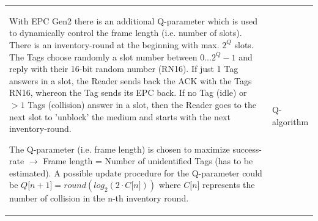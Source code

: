 	\begin{tabular}{ll}
		\parbox{10cm}{
			With EPC Gen2 there is an additional Q-parameter which is used to dynamically control the frame length (i.e. number of slots). 
			There is an inventory-round at the beginning with max. $2^Q$ slots. The Tags choose randomly a slot number between $0 ... 2^Q-1$ and 
			reply with their 16-bit random number (RN16). If just 1 Tag answers in a slot, the Reader sends back the ACK with the Tags RN16, 
			whereon the Tag sends its EPC back. If no Tag (idle) or $>1$ Tags (collision) answer in a slot, then the Reader goes to the next 
			slot to 'unblock' the medium and starts with the next inventory-round.
			
			The Q-parameter (i.e. frame length) is chosen to maximize success-rate $\rightarrow$ Frame length = Number of unidentified Tags (has to be estimated).
			A possible update procedure for the Q-parameter could be \\
			$Q\lbrack n+1\rbrack = round(log_2(2\cdot C\lbrack n\rbrack))$ where $C\lbrack n\rbrack$ represents the number of collision in the n-th 
			inventory round.
		}	
		& \parbox{8cm}{
			\\ Q-algorithm
		}
	\end{tabular}


